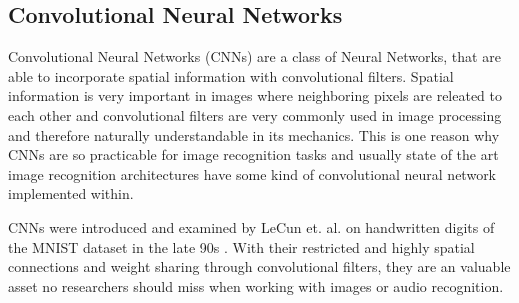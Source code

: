 
\subsection{Convolutional Neural Networks}\label{sec:prev_nn_cnn}
Convolutional Neural Networks (CNNs) are a class of Neural Networks, that are able to incorporate spatial information with convolutional filters.
Spatial information is very important in images where neighboring pixels are releated to each other and convolutional filters are very commonly used in image processing and therefore naturally understandable in its mechanics.
This is one reason why CNNs are so practicable for image recognition tasks and usually state of the art image recognition architectures have some kind of convolutional neural network implemented within.

CNNs were introduced and examined by LeCun et. al. on handwritten digits of the MNIST dataset in the late 90s
\cite{LeCun1998}.
With their restricted and highly spatial connections and weight sharing through convolutional filters, they are an valuable asset no researchers should miss when working with images or audio recognition.
